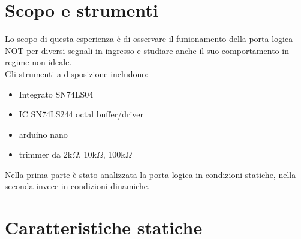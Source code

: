 \section{Scopo e strumenti}
Lo scopo di questa esperienza è di osservare il funionamento della porta logica NOT per diversi segnali in ingresso e studiare anche il suo comportamento in regime non ideale.\\
Gli strumenti a disposizione includono:
\begin{itemize}
\item{Integrato SN74LS04}
\item{IC SN74LS244 octal buffer/driver}
\item{arduino nano}
\item{trimmer da 2k$\Omega$, 10k$\Omega$, 100k$\Omega$}
\end{itemize}
Nella prima parte è stato analizzata la porta logica in condizioni statiche, nella seconda invece in condizioni dinamiche.\\

\section{Caratteristiche statiche}
